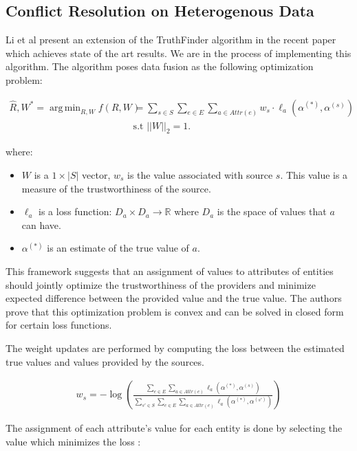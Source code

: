 \documentclass{acm_proc_article-sp}
\DeclareMathOperator*{\argmin}{arg\,min}
\begin{document}
\subsection{Conflict Resolution on Heterogenous Data}

Li et al present an extension of the {\sc TruthFinder} algorithm in the recent paper \cite{li:resolving} which achieves state of the art results. We are in the process of implementing this algorithm. The algorithm poses data fusion as the following optimization problem: 

\begin{align}
\hat{R}, W^* = \argmin_{R,W} f(R, W) & = \sum_{s \in S} \sum_{e \in E} \sum_{a \in Attr(e)} w_s \cdot \ell_a(\alpha^{(*)}, \alpha^{(s)}) \\
& \text{s.t } ||W||_2 =1. \nonumber 
\end{align}

where: 

\begin{itemize}
\item $W$ is a $1\times|S|$ vector, $w_s$ is the value associated with source $s$. This value is a measure of the trustworthiness of the source. 
\item $\ell_a$ is a loss function: $D_a \times D_a \rightarrow \mathbb{R}$ where $D_a$ is the space of values that $a$ can have. 
\item $\alpha^{(*)}$ is an estimate of the true value of $a$. 
\end{itemize}

This framework suggests that an assignment of values to attributes of entities should jointly optimize the trustworthiness of the providers and minimize expected difference between the provided value and the true value. The authors prove that this optimization problem is convex and can be solved in closed form for certain loss functions. 

The weight updates are performed by computing the loss between the estimated true values and values provided by the sources. 

\begin{align}
w_s = - \log \left ( \frac{\sum_{e \in E} \sum_{a \in Attr(e)} \ell_a(\alpha^{(*)}, \alpha^{(s)})}{\sum_{s' \in S} \sum_{e \in E}  \sum_{a \in Attr(e)} \ell_a(\alpha^{(*)}, \alpha^{(s')})} \right )
\end{align}

The assignment of each attribute's value for each entity is done by selecting the value which minimizes the loss : 
\end{document}
